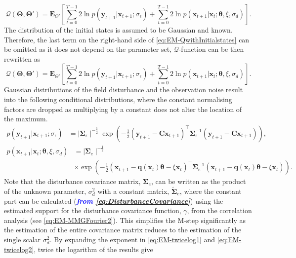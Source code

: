 \documentclass[]{article}
\newcommand{\parham}[1]{\textsf{\emph{\textbf{\textcolor{blue}{#1}}}}}
\begin{document}
\begin{equation}\label{eq:QIntermsofJointDist}
\mathcal Q(\boldsymbol \Theta,\boldsymbol\Theta')=\mathbf E_{\Theta'}\left[\sum_{t=0}^{T-1}2\ln p(\mathbf y_{t+1}|\mathbf x_{t+1}; \sigma_{\epsilon})+\sum_{t=0}^{T-1}2\ln p(\mathbf x_{t+1}|\mathbf x_{t};\boldsymbol \theta, \xi ,\sigma_d)\right].
\end{equation}
The distribution of the initial states is assumed to be Gaussian and known. Therefore, the last term on the right-hand side of \eqref{eq:EM-QwithInitialstates} can be omitted as it does not depend on the parameter set, $\mathcal Q$-function can be then rewritten as
\begin{equation}\label{eq:QIntermsofJointDist}
\mathcal Q(\boldsymbol \Theta,\boldsymbol\Theta')=\mathbf E_{\Theta'}\left[\sum_{t=0}^{T-1}2\ln p(\mathbf y_{t+1}|\mathbf x_{t+1}; \sigma_{\epsilon})+\sum_{t=0}^{T-1}2\ln p(\mathbf x_{t+1}|\mathbf x_{t};\boldsymbol \theta, \xi ,\sigma_d)\right].
\end{equation}
Gaussian distributions of the field disturbance and the observation noise result into the following conditional distributions, where the constant normalising factors are dropped as multiplying by a constant does not alter the location of the maximum.
\begin{align}\label{eq:EM-twicelog1}
 p\left(\mathbf y_{t+1}|\mathbf x_{t+1};\sigma_{\epsilon}\right)&= \mid\boldsymbol\Sigma_{\epsilon}\mid^{-\frac{1}{2}}  \exp\left({-\frac{1}{2}\left(\mathbf y_{t+1}-\mathbf C\mathbf  x_{t+1}\right)^\top\boldsymbol\Sigma_{\epsilon}^{-1}\left(\mathbf y_{t+1}-\mathbf C\mathbf  x_{t+1}\right)}\right),
\end{align}
\begin{align}\label{eq:EM-twicelog2}
p(\mathbf x_{t+1}|\mathbf x_{t};\boldsymbol \theta , \xi, \sigma_d)&= \mid\boldsymbol\Sigma_{e}\mid^{-\frac{1}{2}} \nonumber \\
&\times\exp \left(-\frac{1}{2}(\mathbf x_{t+1}-\mathbf q(\mathbf  x_t)\boldsymbol\theta-\xi  \mathbf x_t)^\top\boldsymbol\Sigma_e^{-1}(\mathbf x_{t+1}-\mathbf q( \mathbf x_t)\boldsymbol\theta-\xi \mathbf  x_t) \right).
\end{align}
Note that the disturbance covariance matrix, $\boldsymbol\Sigma_e$, can be written as the product of the unknown parameter, $\sigma_d^2$ with a constant matrix, $\tilde{\boldsymbol\Sigma}_e$, where the constant part can be calculated (\parham{from \eqref{eq:DisturbanceCovariance}}) using the estimated support for the disturbance covariance function, $\gamma$, from the correlation analysis (see \eqref{eq:EM-MMGFourier2}). This simplifies the M-step significantly as the estimation of the entire covariance matrix  reduces to the estimation of the single scalar  $\sigma_d^2$. By expanding the exponent in \eqref{eq:EM-twicelog1} and \eqref{eq:EM-twicelog2}, twice the logarithm of the results give
\end{document}
